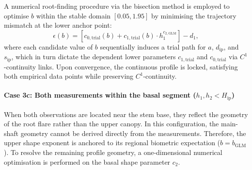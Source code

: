 \documentclass[twocolumn, bibliography=totoc]{scrartcl}
\begin{document}
A numerical root-finding procedure via the bisection method is employed to optimise $b$ within the stable domain $[0.05, 1.95]$ by minimising the trajectory mismatch at the lower anchor point:
\begin{equation}
    \epsilon(b) = \left[ c_{0,\text{trial}}(b) + c_{1,\text{trial}}(b) \cdot h_1^{c_{2,\text{GLM}}} \right] - d_1,
\end{equation}
where each candidate value of $b$ sequentially induces a trial path for $a$, $d_{\text{ip}}$, and $s_{\text{ip}}$, which in turn dictate the dependent lower parameters $c_{1,\text{trial}}$ and $c_{0,\text{trial}}$ via $C^1$-continuity links. Upon convergence, the continuous profile is locked, satisfying both empirical data points while preserving $C^1$-continuity.

\paragraph{Case 3c: Both measurements within the basal segment ($h_1, h_2 < H_{\text{ip}}$)}
When both observations are located near the stem base, they reflect the geometry of the root flare rather than the upper canopy. In this configuration, the main-shaft geometry cannot be derived directly from the measurements. Therefore, the upper shape exponent is anchored to its regional biometric expectation ($b = b_{\text{GLM}}$). To resolve the remaining profile geometry, a one-dimensional numerical optimisation is performed on the basal shape parameter $c_2$.
\end{document}
